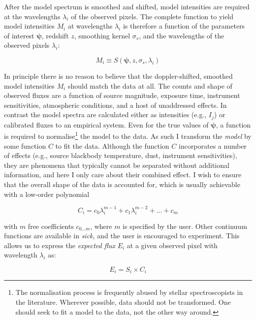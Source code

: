 \documentclass{aastex}
\newcommand{\sick}{\textit{sick}}
\begin{document}
After the model spectrum is smoothed and shifted, model intensities are required at the wavelengths $\lambda_i$ of the observed pixels. The complete function to yield model intensities $M_i$ at wavelengths $\lambda_i$ is therefore a function of the parameters of interest $\bm{\psi}$, redshift $z$, smoothing kernel $\sigma_{s}$, and the wavelengths of the observed pixels $\lambda_i$:

\begin{equation}
 M_{i} \equiv S\left(\bm{\psi},z,\sigma_{s},\lambda_i\right)
\end{equation}

In principle there is no reason to believe that the doppler-shifted, smoothed model intensities $M_i$ should match the data at all. The counts and shape of observed fluxes are a function of source magnitude, exposure time, instrument sensitivities, atmospheric conditions, and a host of unaddressed effects. In contrast the model spectra are calculated either as intensities (e.g., $I_j$) or calibrated fluxes to an empirical system. Even for the true values of $\bm{\psi}$, a function is required to normalise\footnote{The normalisation process is frequently abused by stellar spectroscopists in the literature. Wherever possible, data should not be transformed. One should seek to fit a model to the data, not the other way around.} the model to the data. As such I transform the \textit{model} by some function $C$ to fit the data. Although the function $C$ incorporates a number of effects (e.g., source blackbody temperature, dust, instrument sensitivities), they are phenomena that typically cannot be separated without additional information, and here I only care about their combined effect. I wish to ensure that the overall shape of the data is accounted for, which is usually achievable with a low-order polynomial

\begin{equation}
C_i = c_{0}\lambda_{i}^{m-1} + c_{1}\lambda_{i}^{m-2} + \dots + c_{m}
\end{equation}

\noindent{}with $m$ free coefficients $c_{0\dots{}m}$, where $m$ is specified by the user. Other continuum functions are available in \sick{}, and the user is encouraged to experiment. This allows us to express the \textit{expected flux} $E_i$ at a given observed pixel with wavelength $\lambda_i$ as:

\begin{equation}
E_i = S_{i}\times{}C_i
\end{equation}
\end{document}

